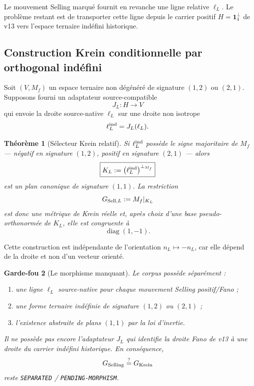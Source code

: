 \documentclass[11pt,a4paper]{article}
\newtheorem{theorem}{Théorème}[section]
\newtheorem{guardrail}[theorem]{Garde-fou}
\newcommand{\certSeparated}{\texttt{SEPARATED}}
\newcommand{\certPending}{\texttt{PENDING-MORPHISM}}
\begin{document}
Le mouvement Selling marqué fournit en revanche une ligne relative $\ell_L$. Le problème restant est de transporter cette ligne depuis le carrier positif $H=\mathbf1_4^\perp$ de v13 vers l'espace ternaire indéfini historique.

\subsection{Construction Krein conditionnelle par orthogonal indéfini}

Soit $(V,M_f)$ un espace ternaire non dégénéré de signature $(1,2)$ ou $(2,1)$. Supposons fourni un adaptateur source-compatible
\[
 J_L:H\longrightarrow V
\]
qui envoie la droite source-native $\ell_L$ sur une droite non isotrope
\[
 \ell_L^{\rm ind}=J_L(\ell_L).
\]

\begin{theorem}[Sélecteur Krein relatif]\label{thm:v24-Krein-selector}
Si $\ell_L^{\rm ind}$ possède le signe majoritaire de $M_f$ --- négatif en signature $(1,2)$, positif en signature $(2,1)$ --- alors
\begin{equation}\label{eq:v24-Krein-plane}
 \boxed{
 K_L
 :=
 \left(\ell_L^{\rm ind}\right)^{\perp_{M_f}}}
\end{equation}
est un plan canonique de signature $(1,1)$. La restriction
\[
 G_{{\rm Sell},L}
 :=
 M_f|_{K_L}
\]
est donc une métrique de Krein réelle et, après choix d'une base pseudo-orthonormée de $K_L$, elle est congruente à
\[
 \operatorname{diag}(1,-1).
\]
\end{theorem}

Cette construction est indépendante de l'orientation $n_L\mapsto-n_L$, car elle dépend de la droite et non d'un vecteur orienté.

\begin{guardrail}[Le morphisme manquant]
Le corpus possède séparément :
\begin{enumerate}[label=\textup{(\roman*)}]
\item une ligne $\ell_L$ source-native pour chaque mouvement Selling positif/Fano ;
\item une forme ternaire indéfinie de signature $(1,2)$ ou $(2,1)$ ;
\item l'existence abstraite de plans $(1,1)$ par la loi d'inertie.
\end{enumerate}
Il ne possède pas encore l'adaptateur $J_L$ qui identifie la droite Fano de v13 à une droite du carrier indéfini historique. En conséquence,
\[
 G_{\rm Selling}\stackrel?=G_{\rm Krein}
\]
reste \certSeparated{} / \certPending{}.
\end{guardrail}
\end{document}
